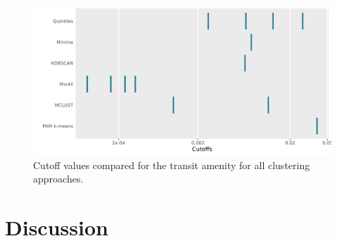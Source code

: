\documentclass[11pt, a4paper]{article}
\begin{document}
\begin{figure}[H]
\centering
\includegraphics[width=\textwidth]{./cutoff_ticks/Transit_ticks.png}
\caption[Transit cutoff comparison]{Cutoff values compared for the transit amenity for all clustering approaches.}\label{transitticks}
\end{figure}














\pagebreak
\justifying
\section{Discussion}
\end{document}
